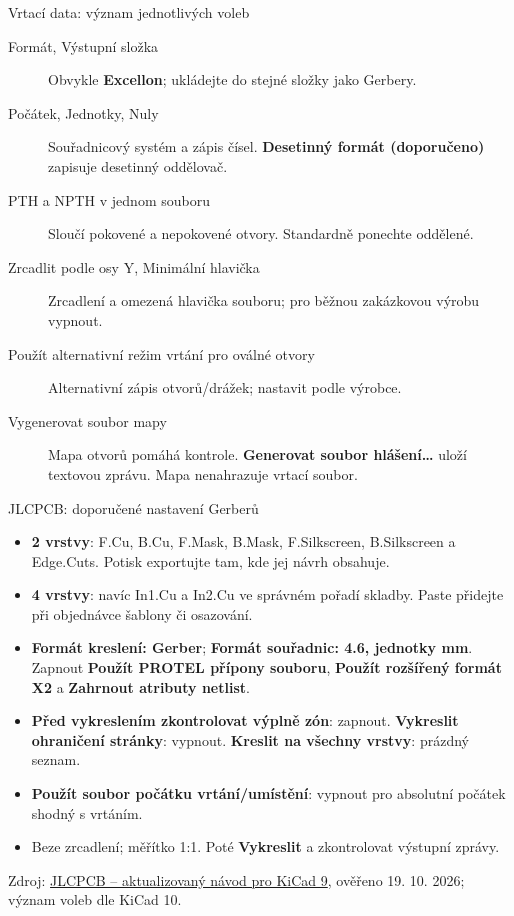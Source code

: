 \documentclass{beamer}
\begin{document}
\begin{frame}[t]{Vrtací data: význam jednotlivých voleb}
	\small
	\begin{description}
		\item[Formát, Výstupní složka] Obvykle \textbf{Excellon}; ukládejte do stejné složky jako Gerbery.
		\item[Počátek, Jednotky, Nuly] Souřadnicový systém a zápis čísel. \textbf{Desetinný formát (doporučeno)} zapisuje desetinný oddělovač.
		\item[PTH a NPTH v jednom souboru] Sloučí pokovené a nepokovené otvory. Standardně ponechte oddělené.
		\item[Zrcadlit podle osy Y, Minimální hlavička] Zrcadlení a omezená hlavička souboru; pro běžnou zakázkovou výrobu vypnout.
		\item[Použít alternativní režim vrtání pro oválné otvory] Alternativní zápis otvorů/drážek; nastavit podle výrobce.
		\item[Vygenerovat soubor mapy] Mapa otvorů pomáhá kontrole. \textbf{Generovat soubor hlášení\ldots} uloží textovou zprávu. Mapa nenahrazuje vrtací soubor.
	\end{description}
\end{frame}

\begin{frame}[t]{JLCPCB: doporučené nastavení Gerberů}
	\small
	\begin{itemize}
		\item \textbf{2 vrstvy}: F.Cu, B.Cu, F.Mask, B.Mask, F.Silkscreen, B.Silkscreen a Edge.Cuts. Potisk exportujte tam, kde jej návrh obsahuje.
		\item \textbf{4 vrstvy}: navíc In1.Cu a In2.Cu ve správném pořadí skladby. Paste přidejte při objednávce šablony či osazování.
		\item \textbf{Formát kreslení: Gerber}; \textbf{Formát souřadnic: 4.6, jednotky mm}. Zapnout \textbf{Použít PROTEL přípony souboru}, \textbf{Použít rozšířený formát X2} a \textbf{Zahrnout atributy netlist}.
		\item \textbf{Před vykreslením zkontrolovat výplně zón}: zapnout. \textbf{Vykreslit ohraničení stránky}: vypnout. \textbf{Kreslit na všechny vrstvy}: prázdný seznam.
		\item \textbf{Použít soubor počátku vrtání/umístění}: vypnout pro absolutní počátek shodný s vrtáním.
		\item Beze zrcadlení; měřítko 1:1. Poté \textbf{Vykreslit} a zkontrolovat výstupní zprávy.
	\end{itemize}
	\vfill
	{\tiny Zdroj: \href{https://jlcpcb.com/help/article/how-to-generate-gerber-and-drill-files-in-kicad-9}{JLCPCB -- aktualizovaný návod pro KiCad 9}, ověřeno 19. 10. 2026; význam voleb dle KiCad 10.}
\end{frame}
\end{document}
